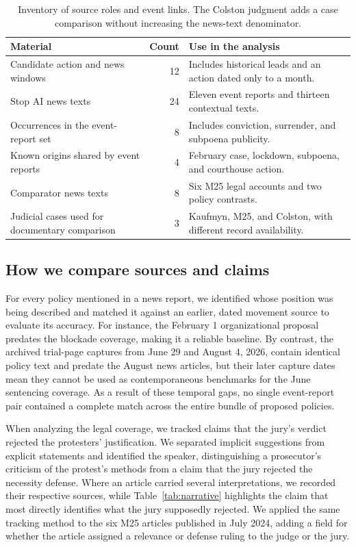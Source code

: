 \documentclass[11pt]{article}
\begin{document}
\begin{table}[!htbp]
\centering\small
\begin{tabularx}{\textwidth}{Y r Y}
\toprule Material & Count & Use in the analysis\\\midrule
Candidate action and news windows & 12 & Includes historical leads and an action dated only to a month.\\
Stop AI news texts & 24 & Eleven event reports and thirteen contextual texts.\\
Occurrences in the event-report set & 8 & Includes conviction, surrender, and subpoena publicity.\\
Known origins shared by event reports & 4 & February case, lockdown, subpoena, and courthouse action.\\
Comparator news texts & 8 & Six M25 legal accounts and two policy contrasts.\\
Judicial cases used for documentary comparison & 3 & Kaufmyn, M25, and Colston, with different record availability.\\
\bottomrule
\end{tabularx}
\caption{Inventory of source roles and event links. The Colston judgment adds a case comparison without increasing the news-text denominator.}
\label{tab:attained}
\end{table}

\FloatBarrier
\subsection{How we compare sources and claims}
For every policy mentioned in a news report, we identified whose position was being described and matched it against an earlier, dated movement source to evaluate its accuracy. For instance, the February 1 organizational proposal predates the blockade coverage, making it a reliable baseline. By contrast, the archived trial-page captures from June 29 and August 4, 2026, contain identical policy text and predate the August news articles, but their later capture dates mean they cannot be used as contemporaneous benchmarks for the June sentencing coverage. As a result of these temporal gaps, no single event-report pair contained a complete match across the entire bundle of proposed policies.

When analyzing the legal coverage, we tracked claims that the jury's verdict rejected the protesters' justification. We separated implicit suggestions from explicit statements and identified the speaker, distinguishing a prosecutor's criticism of the protest's methods from a claim that the jury rejected the necessity defense. Where an article carried several interpretations, we recorded their respective sources, while Table~\ref{tab:narrative} highlights the claim that most directly identifies what the jury supposedly rejected. We applied the same tracking method to the six M25 articles published in July 2024, adding a field for whether the article assigned a relevance or defense ruling to the judge or the jury.
\end{document}

